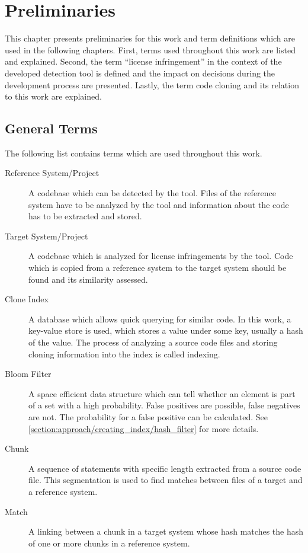 
\chapter{Preliminaries}\label{chapter:preliminaries}
This chapter presents preliminaries for this work and term definitions which are used in the following chapters.
First, terms used throughout this work are listed and explained.
Second, the term \enquote{license infringement} in the context of the developed detection tool is defined and the impact on decisions during the development process are presented.
Lastly, the term code cloning and its relation to this work are explained.

\section{General Terms}\label{section:preliminaries/terms}
The following list contains terms which are used throughout this work.

\begin{description}
	\item[Reference System/Project]
		A codebase which can be detected by the tool. 
		Files of the reference system have to be analyzed by the tool and information about the code has to be extracted and stored.
	\item[Target System/Project]
		A codebase which is analyzed for license infringements by the tool.
		Code which is copied from a reference system to the target system should be found and its similarity assessed.
	\item[Clone Index] 
		A database which allows quick querying for similar code.
		In this work, a key-value store is used, which stores a value under some key, usually a hash of the value.
		The process of analyzing a source code files and storing cloning information into the index is called indexing.
	\item [Bloom Filter]
		A space efficient data structure which can tell whether an element is part of a set with a high probability. 
		False positives are possible, false negatives are not.
		The probability for a false positive can be calculated. 
		See \autoref{section:approach/creating_index/hash_filter} for more details.
	\item [Chunk]
		A sequence of statements with specific length extracted from a source code file.
		This segmentation is used to find matches between files of a target and a reference system.
	\item [Match]
		A linking between a chunk in a target system whose hash matches the hash of one or more chunks in a reference system.
\end{description}

